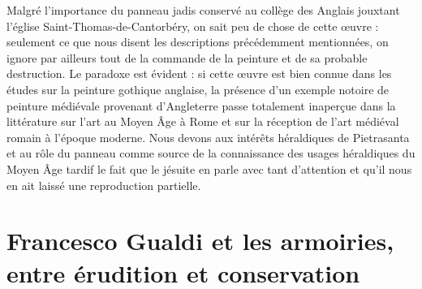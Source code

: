 \documentclass[12pt,twoside,openany]{book}
\begin{document}
Malgré l’importance du panneau jadis conservé au collège des Anglais jouxtant l’église Saint-Thomas-de-Cantorbéry, on sait peu de chose de cette œuvre : seulement ce que nous disent les descriptions précédemment mentionnées, on ignore par ailleurs tout de la commande de la peinture et de sa probable destruction. Le paradoxe est évident : si cette œuvre est bien connue dans les études sur la peinture gothique anglaise, la présence d’un exemple notoire de peinture médiévale provenant d’Angleterre passe totalement inaperçue dans la littérature sur l’art au Moyen Âge à Rome et sur la réception de l’art médiéval romain à l’époque moderne. Nous devons aux intérêts héraldiques de Pietrasanta et au rôle du panneau comme source de la connaissance des usages héraldiques du Moyen Âge tardif le fait que le jésuite en parle avec tant d’attention et qu’il nous en ait laissé une reproduction partielle.

\section{Francesco Gualdi et les armoiries, entre érudition et conservation}
\end{document}
